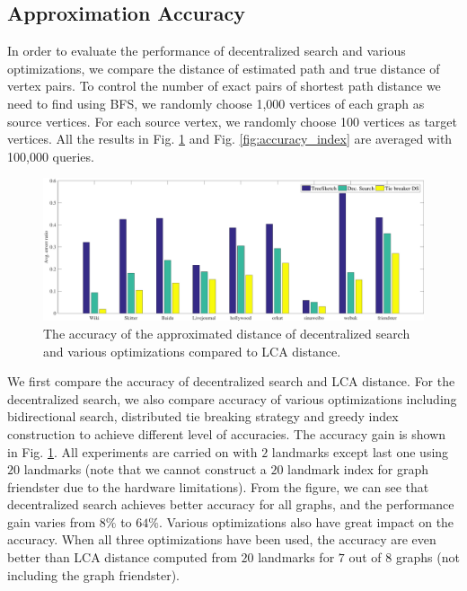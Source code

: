 \subsection{Approximation Accuracy}
\label{eval_accuracy}

In order to evaluate the performance of decentralized search and various optimizations, we compare the distance of estimated path and true distance of vertex pairs. To control the number of exact pairs of shortest path distance we need to find using BFS, we randomly choose 1,000 vertices of each graph as source vertices. For each source vertex, we randomly choose 100 vertices as target vertices. All the results in Fig. \ref{fig:accuracy_dec} and Fig. \ref{fig:accuracy_index} are averaged with 100,000 queries.

\begin{figure}[t]
    \centering
    \includegraphics[width=\linewidth]{../figures/accuracy_dec.pdf}
    \caption{The accuracy of the approximated distance of decentralized search and various optimizations compared to LCA distance.}
    \label{fig:accuracy_dec}
\end{figure}

We first compare the accuracy of decentralized search and LCA distance. For the decentralized search, we also compare accuracy of various optimizations including bidirectional search, distributed tie breaking strategy and greedy index construction to achieve different level of accuracies. The accuracy gain is shown in Fig. \ref{fig:accuracy_dec}. All experiments are carried on with $2$ landmarks except last one using $20$ landmarks (note that we cannot construct a $20$ landmark index for graph friendster due to the hardware limitations). From the figure, we can see that decentralized search achieves better accuracy for all graphs, and the performance gain varies from $8\%$ to $64\%$. Various optimizations also have great impact on the accuracy. When all three optimizations have been used, the accuracy are even better than LCA distance computed from $20$ landmarks for $7$ out of $8$ graphs (not including the graph friendster).

